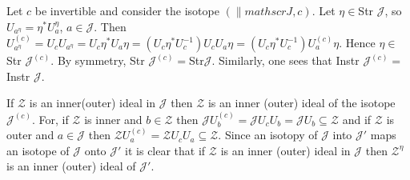 \begin{defn}
Let $c$ be invertible and consider the isotope $(\|mathscr{J},c)$. Let
$\eta \in$Str $\mathscr{J}$, so
$U_{a^{\eta}}=\eta^{\ast}U_{a}^{\eta}$, $a\in \mathscr{J}$. Then
$U_{a^{\eta}}^{(c)}=U_cU_{a^{\eta}}=U_c\eta^{\ast}U_a\eta
=(U_c\eta^{\ast}U_c^{-1})U_cU_a\eta=(U_c\eta^{\ast}U_c^{-1})U_a^{(c)}\eta$. Hence
$\eta \in$Str $\mathscr{J}^{(c)}$. By symmetry, Str
$\mathscr{J}^{(c)}=$Str$\mathscr{J}$. Similarly, one sees that Instr
$\mathscr{J}^{(c)}=$Instr $\mathscr{J}$.

If $\mathscr{Z}$ is an inner(outer) ideal in $\mathscr{J}$ then
$\mathscr{Z}$ is an inner (outer) ideal of the isotope
$\mathscr{J}^{(c)}$. For, if $\mathscr{Z}$ is inner and $b\in
\mathscr{Z}$ then $\mathscr{J} U^{(c)}_b=\mathscr{J}U_cU_b=\mathscr{J}
U_b\subseteq \mathscr{Z}$ and if $\mathscr{Z}$ is outer and $a\in
\mathscr{J}$ then $\mathscr{Z}U_{a}^{(c)}=\mathscr{Z}U_cU_a\subseteq
\mathscr{Z}$. Since an isotopy of $\mathscr{J}$ into $\mathscr{J}'$
maps an isotope of $\mathscr{J}$ onto $\mathscr{J}'$ it is clear that
if $\mathscr{Z}$ is an inner (outer) ideal in $\mathscr{J}$ then
$\mathscr{Z}^{\eta}$ is an inner (outer) ideal of $\mathscr{J}'$.
\end{defn}
